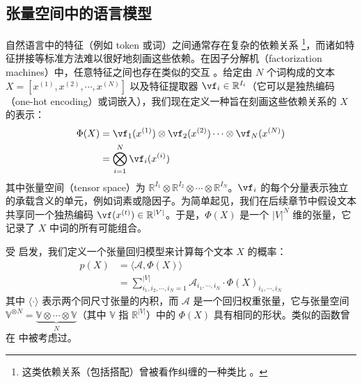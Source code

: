 \subsection{张量空间中的语言模型}
\label{sec:lmts}






自然语言中的特征（例如 token 或词）之间通常存在复杂的依赖关系 \citep{hou2013mining}\footnote{这类依赖关系（包括搭配）曾被看作纠缠的一种类比 \citep{hou2013mining}。}，而诸如特征拼接等标准方法难以很好地刻画这些依赖。在因子分解机（factorization machines）中，任意特征之间也存在类似的交互 \citep{rendle2010factorization}。给定由 $N$ 个词构成的文本 $X = [x^{(1)}, x^{(2)}, \cdots ,x^{(N)}]$ 以及特征提取器 $\vf_i \in \mathbb{R}^{I_i}$（它可以是独热编码（one-hot encoding）或词嵌入），我们现在定义一种旨在刻画这些依赖关系的 $X$ 的表示：
%
\begin{equation}
\begin{split}
    \label{eq: Phi X}
    \Phi(X)
    &= \vf_1 (x^{(1)}) \otimes  \vf_2 (x^{(2)}) \cdots \otimes \vf_N (x^{(N)}) \\
    &= \bigotimes^N_{i=1} \vf_i (x^{(i)}) \\
\end{split}
\end{equation}
%
其中张量空间（tensor space）为 $\mathbb{R}^{I_1}\otimes\mathbb{R}^{I_2} \otimes\cdots\otimes\mathbb{R}^{I_N}$。$\vf_i$ 的每个分量表示独立的承载含义的单元，例如词素或隐因子。为简单起见，我们在后续章节中假设文本共享同一个独热编码 $\vf(x^{(t)}) \in \mathbb{R}^{|V|}$。于是，$\Phi(X)$ 是一个 $|V|^N$ 维的张量，它记录了 $X$ 中词的所有可能组合。

受 \cite{zhang2019generalized, kossaifi2020tensor} 启发，我们定义一个张量回归模型来计算每个文本 $X$ 的概率：
%
\begin{align}
    \label{eq: general definition}
    p(X)
    &= \langle\mathcal{A}, \Phi(X)\rangle \nonumber \\
    &= \sum_{i_1,i_2,\cdots,i_N = 1}^{|V|} \mathcal{A}_{i_1,\cdots, i_N} \cdot \Phi(X)_{i_1,\cdots, i_N}
\end{align}
%
其中 $\langle \cdot \rangle$ 表示两个同尺寸张量的内积，而 $\mathcal{A}$ 是一个回归权重张量，它与张量空间 $\mathbb{V}^{\otimes N} = \underbrace{\mathbb{V} \otimes \cdots \otimes \mathbb{V}}_N $（其中 $\mathbb{V}$ 指 $\mathbb{R}^{|V|}$）中的 $\Phi(X)$ 具有相同的形状。类似的函数曾在 \cite{novikov2016exponential, NIPS2016_6211, khrulkov2018expressive, zhang2019generalized} 中被考虑过。


